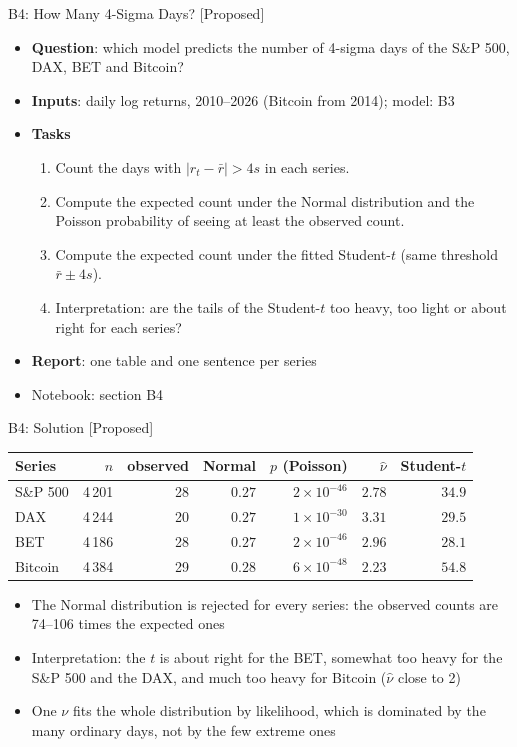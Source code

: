 \begin{frame}{B4: How Many 4-Sigma Days? [Proposed]}
\itemsize{\footnotesize}
\begin{itemize}
\item \textbf{Question}: which model predicts the number of 4-sigma days of the S\&P 500, DAX, BET and Bitcoin?
\item \textbf{Inputs}: daily log returns, 2010--2026 (Bitcoin from 2014); model: B3
\item \textbf{Tasks}
\begin{enumerate}
    \item Count the days with $|r_t - \bar r| > 4s$ in each series.
    \item Compute the expected count under the Normal distribution and the Poisson probability of seeing at least the observed count.
    \item Compute the expected count under the fitted Student-$t$ (same threshold $\bar r \pm 4s$).
    \item Interpretation: are the tails of the Student-$t$ too heavy, too light or about right for each series?
\end{enumerate}
\item \textbf{Report}: one table and one sentence per series
\item Notebook: section B4
\end{itemize}
\end{frame}

\ifsolutions
\begin{frame}{B4: Solution [Proposed]}
\itemsize{\footnotesize}
\begin{center}
\footnotesize
\begin{tabular}{lrrrrrr}
\toprule
Series & $n$ & observed & Normal & $p$ (Poisson) & $\hat\nu$ & Student-$t$ \\
\midrule
S\&P 500 & 4\,201 & 28 & $0.27$ & ${2 \times 10^{-46}}$ & $2.78$ & $34.9$ \\
DAX & 4\,244 & 20 & $0.27$ & ${1 \times 10^{-30}}$ & $3.31$ & $29.5$ \\
BET & 4\,186 & 28 & $0.27$ & ${2 \times 10^{-46}}$ & $2.96$ & $28.1$ \\
Bitcoin & 4\,384 & 29 & $0.28$ & ${6 \times 10^{-48}}$ & $2.23$ & $54.8$ \\
\bottomrule
\end{tabular}
\end{center}
\begin{itemize}
    \item The Normal distribution is rejected for every series: the observed counts are 74--106 times the expected ones
    \item Interpretation: the $t$ is about right for the BET, somewhat too heavy for the S\&P 500 and the DAX, and much too heavy for Bitcoin ($\hat\nu$ close to 2)
    \item One $\nu$ fits the whole distribution by likelihood, which is dominated by the many ordinary days, not by the few extreme ones
\end{itemize}
\end{frame}
\fi

